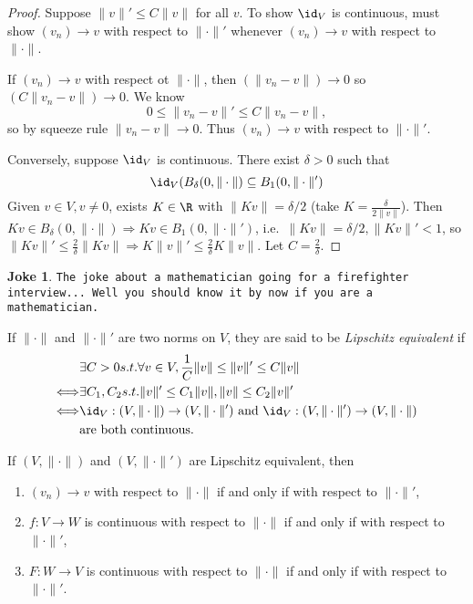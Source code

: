 \documentclass[a4paper]{article}
\theoremstyle{definition}
\newtheorem*{joke}{Joke}
\begin{document}
\begin{proof}
  Suppose \(\|v\|' \leq C \|v\|\) for all \(v\). To show \(\id_V\) is continuous, must show \((v_n)\to v\) with respect to \(\|\cdot\|'\) whenever \((v_n)\to v\) with respect to \(\|\cdot\|\).

  If \((v_n)\to v\) with respect ot \(\|\cdot\|\), then \((\|v_n-v\|)\to 0\) so \((C\|v_n-v\|)\to 0\). We know
  \[
    0 \leq \|v_n-v\|' \leq C \|v_n-v\|,
  \]
  so by squeeze rule \(\|v_n-v\|\to 0\). Thus \((v_n)\to v\) with respect to \(\|\cdot\|'\).

  Conversely, suppose \(\id_V\) is continuous. There exist \(\delta>0\) such that
  \[
    \id_V(B_\delta(0, \|\cdot\|) \subseteq B_1(0, \|\cdot\|')
  \]
  Given \(v \in V, v \neq 0\), exists \(K\in\R\) with \(\|Kv\| = \delta/2\) (take \(K=\frac{\delta}{2 \|v\|}\)). Then \(Kv \in B_\delta(0,\|\cdot\|) \Rightarrow Kv\in B_1(0,\|\cdot\|')\), i.e.\ \(\|Kv\| = \delta/2, \|Kv\|' < 1\), so \(\|Kv\|' \leq \frac{2}{\delta}\|Kv\| \Rightarrow K \|v\|' \leq \frac{2}{\delta}K \|v\|\). Let \(C = \frac{2}{\delta}\).
\end{proof}

\begin{joke}
  {\raggedright
    \texttt{The joke about a mathematician going for a firefighter interview... Well you should know it by now if you are a mathematician.}
    \par}
\end{joke}

\begin{definition}
  \label{def:Lipschitz equivalence}
  If \(\|\cdot\|\) and \(\|\cdot\|'\) are two norms on \(V\), they are said to be \emph{Lipschitz equivalent} if
  \begin{align*}
    & \exists C>0 s.t. \forall v \in V, \frac{1}{C}\|v\| \leq \|v\|' \leq C \|v\| \\
    \Longleftrightarrow & \exists C_1,C_2 s.t. \|v\|' \leq C_1 \|v\|, \|v\| \leq C_2 \|v\|' \\
    \Longleftrightarrow & \id_V:(V,\|\cdot\|)\to (V,\|\cdot\|') \text{ and } \id_V:(V,\|\cdot\|')\to (V,\|\cdot\|) \\
    & \text{are both continuous.}
  \end{align*}
\end{definition}

\begin{corollary}
  If \((V, \|\cdot\|)\) and \((V, \|\cdot\|')\) are Lipschitz equivalent, then
  \begin{enumerate}
  \item \((v_n)\to v\) with respect to \(\|\cdot\|\) if and only if with respect to \(\|\cdot\|'\),
  \item \(f:V\to W\) is continuous with respect to \(\|\cdot\|\) if and only if with respect to \(\|\cdot\|'\),
  \item \(F:W\to V\) is continuous with respect to \(\|\cdot\|\) if and only if with respect to \(\|\cdot\|'\).
  \end{enumerate}
\end{corollary}
\end{document}

